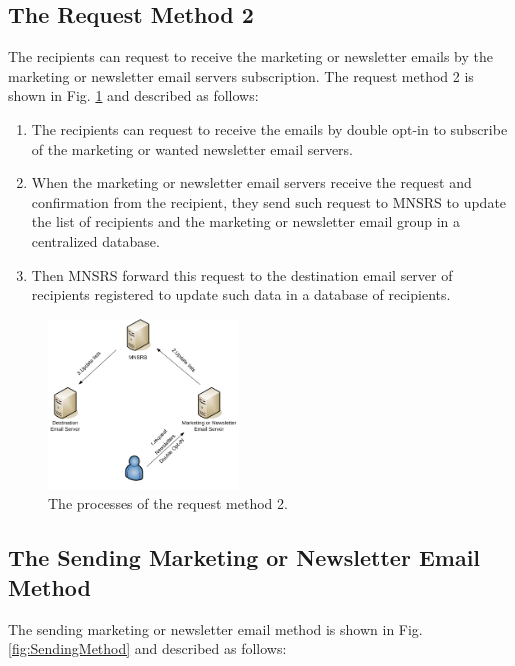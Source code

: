 \documentclass[conference]{IEEEtran}
\begin{document}
\subsection{The Request Method 2}

The recipients can request to receive the marketing or newsletter emails by  the marketing or newsletter email servers subscription.
%
The request method 2 is
shown in Fig. \ref{fig:Method2Process} and described as follows:
\begin{enumerate}
  \item The recipients can request to receive the emails by double opt-in \cite{Allman:DoubleOptIn} to subscribe of the marketing or wanted newsletter email servers.
  \item When the marketing or newsletter email servers receive the request and confirmation from the recipient, they send such request to MNSRS to update the list of recipients and the marketing or newsletter email group in a centralized database. 
  \item Then MNSRS forward this request to the destination email server of recipients registered to update such data in a database of recipients. 
\end{enumerate}

\begin{figure}
\centering
\includegraphics[width=0.45\textwidth]{3.pdf}
\caption{The processes of the request method 2.}
\label{fig:Method2Process}
\end{figure}

\subsection{The Sending Marketing or Newsletter Email Method}
\label{subsec:3}
The sending marketing or newsletter email method is
shown in Fig. \ref{fig:SendingMethod} and described as follows:
\end{document}
